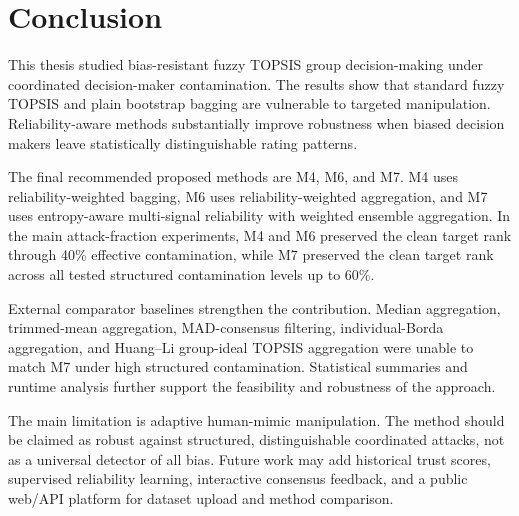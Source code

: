 \chapter{Conclusion}

This thesis studied bias-resistant fuzzy TOPSIS group decision-making under coordinated decision-maker contamination. The results show that standard fuzzy TOPSIS and plain bootstrap bagging are vulnerable to targeted manipulation. Reliability-aware methods substantially improve robustness when biased decision makers leave statistically distinguishable rating patterns.

The final recommended proposed methods are M4, M6, and M7. M4 uses reliability-weighted bagging, M6 uses reliability-weighted aggregation, and M7 uses entropy-aware multi-signal reliability with weighted ensemble aggregation. In the main attack-fraction experiments, M4 and M6 preserved the clean target rank through 40\% effective contamination, while M7 preserved the clean target rank across all tested structured contamination levels up to 60\%.

External comparator baselines strengthen the contribution. Median aggregation, trimmed-mean aggregation, MAD-consensus filtering, individual-Borda aggregation, and Huang--Li group-ideal TOPSIS aggregation were unable to match M7 under high structured contamination. Statistical summaries and runtime analysis further support the feasibility and robustness of the approach.

The main limitation is adaptive human-mimic manipulation. The method should be claimed as robust against structured, distinguishable coordinated attacks, not as a universal detector of all bias. Future work may add historical trust scores, supervised reliability learning, interactive consensus feedback, and a public web/API platform for dataset upload and method comparison.
